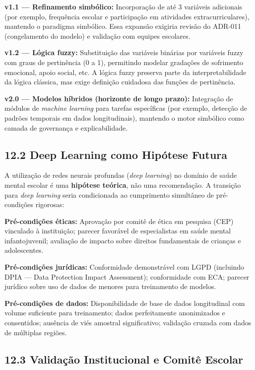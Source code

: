 \documentclass[11pt]{article}
\begin{document}
\textbf{v1.1 --- Refinamento simbólico:} Incorporação de até 3 variáveis
adicionais (por exemplo, frequência escolar e participação em atividades
extracurriculares), mantendo o paradigma simbólico. Essa expansão
exigiria revisão do ADR-011 (congelamento do modelo) e validação com
equipes escolares.

\textbf{v1.2 --- Lógica fuzzy:} Substituição das variáveis binárias por
variáveis fuzzy com graus de pertinência (0 a 1), permitindo modelar
gradações de sofrimento emocional, apoio social, etc. A lógica fuzzy
preserva parte da interpretabilidade da lógica clássica, mas exige
definição cuidadosa das funções de pertinência.

\textbf{v2.0 --- Modelos híbridos (horizonte de longo prazo):}
Integração de módulos de \emph{machine learning} para tarefas
específicas (por exemplo, detecção de padrões temporais em dados
longitudinais), mantendo o motor simbólico como camada de governança e
explicabilidade.

\subsection{12.2 Deep Learning como Hipótese
Futura}\label{deep-learning-como-hipuxf3tese-futura}

A utilização de redes neurais profundas (\emph{deep learning}) no
domínio de saúde mental escolar é uma \textbf{hipótese teórica}, não uma
recomendação. A transição para \emph{deep learning} seria condicionada
ao cumprimento simultâneo de pré-condições rigorosas:

\textbf{Pré-condições éticas:} Aprovação por comitê de ética em pesquisa
(CEP) vinculado à instituição; parecer favorável de especialistas em
saúde mental infantojuvenil; avaliação de impacto sobre direitos
fundamentais de crianças e adolescentes.

\textbf{Pré-condições jurídicas:} Conformidade demonstrável com LGPD
(incluindo DPIA --- Data Protection Impact Assessment); conformidade com
ECA; parecer jurídico sobre uso de dados de menores para treinamento de
modelos.

\textbf{Pré-condições de dados:} Disponibilidade de base de dados
longitudinal com volume suficiente para treinamento; dados perfeitamente
anonimizados e consentidos; ausência de viés amostral significativo;
validação cruzada com dados de múltiplas regiões.

\subsection{12.3 Validação Institucional e Comitê
Escolar}\label{validauxe7uxe3o-institucional-e-comituxea-escolar}
\end{document}
